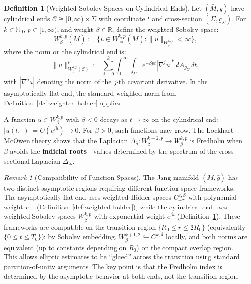 \documentclass[12pt]{article}
\theoremstyle{plain}
\theoremstyle{definition}
\newtheorem{definition}[theorem]{Definition}
\theoremstyle{remark}
\newtheorem{remark}[theorem]{Remark}
\newcommand{\bg}{\bar{g}}
\newcommand{\bM}{\bar{M}}
\newcommand{\Hoelder}{\beta}
\begin{document}
\begin{definition}[Weighted Sobolev Spaces on Cylindrical Ends]\label{def:weighted-sobolev-cyl}
Let $(\bM, \bg)$ have cylindrical ends $\mathcal{C} \cong [0,\infty) \times \Sigma$ with coordinate $t$ and cross-section $(\Sigma, g_\Sigma)$. For $k \in \mathbb{N}_0$, $p \in [1,\infty)$, and weight $\beta \in \mathbb{R}$, define the weighted Sobolev space:
\[
W^{k,p}_\beta(\bM) := \{u \in W^{k,p}_{\mathrm{loc}}(\bM) : \|u\|_{W^{k,p}_\beta} < \infty\},
\]
where the norm on the cylindrical end is:
\[
\|u\|_{W^{k,p}_\beta(\mathcal{C})}^p := \sum_{j=0}^{k} \int_0^\infty \int_\Sigma e^{-\beta p t} |\nabla^j u|^p \, dA_{g_\Sigma} \, dt,
\]
with $|\nabla^j u|$ denoting the norm of the $j$-th covariant derivative. In the asymptotically flat end, the standard weighted norm from Definition~\ref{def:weighted-holder} applies.

A function $u \in W^{k,p}_\beta$ with $\beta < 0$ decays as $t \to \infty$ on the cylindrical end: $|u(t, \cdot)| = O(e^{\beta t}) \to 0$. For $\beta > 0$, such functions may grow. The Lockhart--McOwen theory \cite{lockhartmccowen1985} shows that the Laplacian $\Delta_{\bg}: W^{k+2,p}_\beta \to W^{k,p}_\beta$ is Fredholm when $\beta$ avoids the \textbf{indicial roots}---values determined by the spectrum of the cross-sectional Laplacian $\Delta_\Sigma$.
\end{definition}

\begin{remark}[Compatibility of Function Spaces]\label{rem:space-compatibility}
The Jang manifold $(\bM, \bg)$ has two distinct asymptotic regions requiring different function space frameworks. The asymptotically flat end uses weighted H\"older spaces $C^{k,\Hoelder}_{-\tau}$ with polynomial weight $r^{-\tau}$ (Definition~\ref{def:weighted-holder}), while the cylindrical end uses weighted Sobolev spaces $W^{k,p}_\beta$ with exponential weight $e^{\beta t}$ (Definition~\ref{def:weighted-sobolev-cyl}). These frameworks are compatible on the transition region $\{R_0 \leq r \leq 2R_0\}$ (equivalently $\{0 \leq t \leq T_0\}$): by Sobolev embedding, $W^{k+1,2}_\beta \hookrightarrow C^{k,\Hoelder}$ locally, and both norms are equivalent (up to constants depending on $R_0$) on the compact overlap region. This allows elliptic estimates to be ``glued'' across the transition using standard partition-of-unity arguments. The key point is that the Fredholm index is determined by the asymptotic behavior at both ends, not the transition region.
\end{remark}
\end{document}
